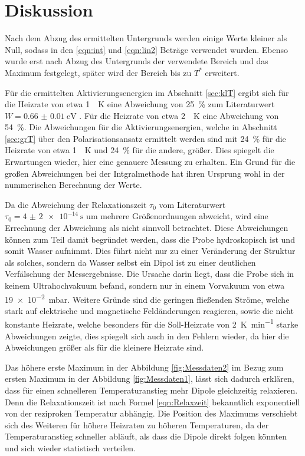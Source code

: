 \section{Diskussion}
\label{sec:Diskussion}
Nach dem Abzug des ermittelten Untergrunds werden einige Werte kleiner als Null, sodass in den \eqref{eqn:int} und \eqref{eqn:lin2} Beträge
verwendet wurden. Ebenso wurde erst nach Abzug des Untergrunds der verwendete Bereich und das Maximum festgelegt, später wird der Bereich bis zu
$T^*$ erweitert.

Für die ermittelten Aktivierungsenergien im Abschnitt \ref{sec:klT} ergibt sich für die Heizrate von etwa \SI{1}{\per\kelvin} eine 
Abweichung von \SI{25}{\percent} zum Literaturwert $W = \SI{0.66(1)}{\electronvolt}$ \cite{quelle}.
Für die Heizrate von  etwa \SI{2}{\per\kelvin} eine Abweichung von \SI{54}{\percent}. 
Die Abweichungen für die Aktivierungsenergien, welche in Abschnitt \ref{sec:grT} über den Polarisationsansatz ermittelt werden sind mit
\SI{24}{\percent} für die Heizrate von etwa \SI{1}{\per\kelvin} und \SI{24}{\percent} für die andere, größer. Dies 
spiegelt die Erwartungen wieder, hier eine genauere Messung zu erhalten. Ein Grund für die großen Abweichungen
bei der Intgralmethode hat ihren Ursprung wohl in der nummerischen Berechnung der Werte.

Da die Abweichung der Relaxationszeit $\tau_0$ vom Literaturwert $\tau_0 = \SI{4(2)e-14}{\second}$ um mehrere Größenordnungen
abweicht, wird eine Errechnung der Abweichung als nicht sinnvoll betrachtet.
Diese Abweichungen können zum Teil damit begründet werden, dass die Probe hydroskopisch ist 
und somit Wasser aufnimmt. Dies führt nicht nur zu einer Veränderung der Struktur als solches, sondern da Wasser selbst ein 
Dipol ist zu einer deutlichen Verfälschung der Messergebnisse. Die Ursache darin liegt, dass die Probe sich in keinem 
Ultrahochvakuum befand, sondern nur in einem Vorvakuum von etwa \SI{19e-2}{\milli\bar}. 
Weitere Gründe sind die geringen fließenden Ströme, welche stark auf elektrische und magnetische Feldänderungen reagieren, sowie
die nicht konstante Heizrate, welche besonders für die Soll-Heizrate von \SI{2}{\kelvin\per\minute} starke Abweichungen zeigte, dies 
spiegelt sich auch in den Fehlern wieder, da hier die Abweichungen größer als für die kleinere Heizrate sind.


Das höhere erste Maximum in der Abbildung \ref{fig:Messdaten2} im Bezug zum ersten Maximum in der Abbildung \ref{fig:Messdaten1}, lässt
sich dadurch erklären, dass für einen schnelleren Temperaturanstieg mehr Dipole gleichzeitig relaxieren. Denn die Relaxationszeit
ist nach Formel \eqref{eqn:Relaxzeit} bekanntlich exponentiell von der reziproken Temperatur abhängig.
Die Position des Maximums verschiebt sich des Weiteren für höhere Heizraten zu höheren Temperaturen, da der Temperaturanstieg
schneller abläuft, als dass die Dipole direkt folgen könnten und sich wieder statistisch verteilen.

